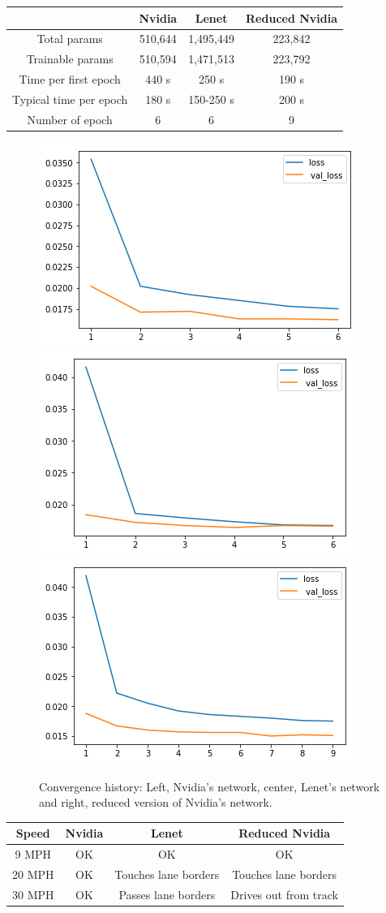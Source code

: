 \documentclass[12pt,a4paper]{article}
\begin{document}
\begin{tabular}{|c|c|c|c|}
	\hline 
	&Nvidia  &Lenet  &Reduced Nvidia  \\ 
	\hline 
	Total params &   510,644& 1,495,449 & 223,842 \\ 
	\hline 
	Trainable params & 510,594 & 1,471,513 & 223,792\\ 
	\hline 
	Time per first epoch &  440 s& 250 s & 190 s\\ 
	\hline 
Typical time per epoch & 180 s & 150-250 s & 200 s\\ 
	\hline 
	Number of epoch& 6 & 6  & 9 \\ 
	\hline 
\end{tabular} 



\begin{figure}[H]
	\centering
	\includegraphics[width=0.3\linewidth]{writeup_figures/nvidia_loss}
	\includegraphics[width=0.3\linewidth]{writeup_figures/lenet_loss}		\includegraphics[width=0.3\linewidth]{writeup_figures/nvidia_reduced_loss}
	\caption{Convergence history: Left, Nvidia's network, center, Lenet's network and right, reduced version of Nvidia's network.}
	\label{fig:models}
\end{figure}

\begin{tabular}{|c|c|c|c|}
	\hline 
	Speed &Nvidia  &Lenet  &Reduced Nvidia  \\ 
	\hline 
	9 MPH  &   OK& OK & OK \\ 
	\hline 
	20 MPH& OK & Touches lane borders & Touches lane borders\\ 
	\hline 
	30 MPH&  OK& Passes lane borders & Drives out from track\\ 
	\hline  
\end{tabular} 
\end{document}
